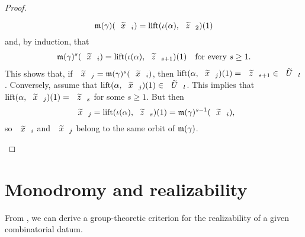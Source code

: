 \begin{proof}
\begin{twoimplications}
\[
\Mon(\gamma)(\wtilde{x}_i)=\lift{\invpath{\alpha}}{\wtilde{z}_2}(1)
\]
and, by induction, that
\begin{align*}
\Mon(\gamma)^s(\wtilde{x}_i)=\lift{\invpath{\alpha}}{\wtilde{z}_{s+1}}(1)&&\text{for every $s\ge 1$.}
\end{align*}
This shows that, if $\wtilde{x}_j=\Mon(\gamma)^s(\wtilde{x}_i)$, then $\lift{\alpha}{\wtilde{x}_j}(1)=\wtilde{z}_{s+1}\in\wtilde{U}_l$.
\leftimplication
Conversely, assume that $\lift{\alpha}{\wtilde{x}_j}(1)\in\wtilde{U}_l$. This implies that $\lift{\alpha}{\wtilde{x}_j}(1)=\wtilde{z}_s$ for some $s\ge 1$. But then
\[
\wtilde{x}_j=\lift{\invpath{\alpha}}{\wtilde{z}_s}(1)=\Mon(\gamma)^{s-1}(\wtilde{x}_i),
\]
so $\wtilde{x}_i$ and $\wtilde{x}_j$ belong to the same orbit of $\mathfrak{m}(\gamma)$.\qedhere
\end{twoimplications}
\end{proof}

\section{Monodromy and realizability}

From , we can derive a group-theoretic criterion for the realizability of a given combinatorial datum.


